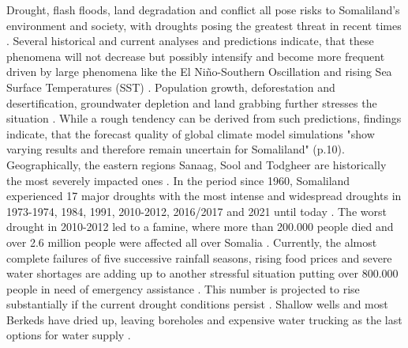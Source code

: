Drought, flash floods, land degradation and conflict all pose risks to Somaliland's environment and society, with droughts posing the greatest threat in recent times \autocite{abdulkadirAssessmentDroughtRecurrence2017}. Several historical and current analyses and predictions indicate, that these phenomena will not decrease but possibly intensify and become more frequent driven by large phenomena like the El Niño-Southern Oscillation and rising Sea Surface Temperatures (SST) \autocite{abdulkadirAssessmentDroughtRecurrence2017,aliMitigatingNaturalDisasters2017a, balintMonitoringDroughtCombined2013, erianGARSpecialReport2021, faoswalimSomaliaWaterLand, museiSPEIbasedSpatialTemporal2021, nationaldroughtcommitteeSOMALILANDDROUGHTRAPID2022,trisosAfrica2022}. Population growth, deforestation and desertification, groundwater depletion and land grabbing further stresses the situation \autocite{aliMitigatingNaturalDisasters2017a}. While a rough tendency can be derived from such predictions, \textcite{abdulkadirAssessmentDroughtRecurrence2017} findings indicate, that the forecast quality of global climate model simulations "show varying results and therefore remain uncertain for Somaliland" (p.10).\newline
Geographically, the eastern regions Sanaag, Sool and Todgheer are historically the most severely impacted ones \autocite{abdulkadirAssessmentDroughtRecurrence2017, faoswalimSomaliaWaterLand}. In the period since 1960, Somaliland experienced 17 major droughts with the most intense and widespread droughts in 1973-1974, 1984, 1991, 2010-2012, 2016/2017 and 2021 until today \autocite{abdulkadirAssessmentDroughtRecurrence2017, credEMDATInternationalDisasters2023}. The worst drought in 2010-2012 led to a famine, where more than 200.000 people died and over 2.6 million people were affected all over Somalia \autocite{srcsDRMStrategicPlan2021}.\newline
Currently, the almost complete failures of five successive rainfall seasons, rising food prices and severe water shortages are adding up to another stressful situation putting over 800.000 people in need of emergency assistance \autocite{nationaldroughtcommitteeSOMALILANDDROUGHTRAPID2022}. This number is projected to rise substantially if the current drought conditions persist \autocite{swansonNearlyMillionPeople2022}. Shallow wells and most Berkeds have dried up, leaving boreholes and expensive water trucking as the last options for water supply \autocite{nationaldroughtcommitteeSOMALILANDDROUGHTRAPID2022}.\newline
